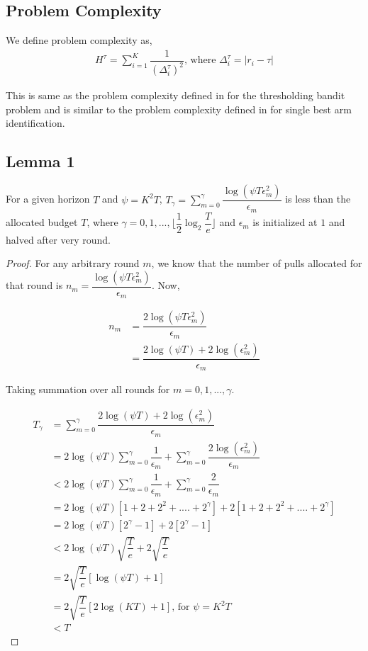 

\subsection{Problem Complexity}

We define problem complexity as,
\begin{align*}
H^{\tau} = \sum_{i=1}^{K}\dfrac{1}{(\Delta_{i}^{\tau})^{2}} \text{, where } \Delta_{i}^{\tau}=|r_{i}-\tau|
\end{align*}

This is same as the problem complexity defined in \cite{locatelli2016optimal} for the thresholding bandit problem and is similar to the problem complexity defined in \cite{audibert2010best} for single best arm identification.

\subsection{Lemma 1} For a given horizon $T$ and $\psi=K^{2}T$, $T_{\gamma} = \sum_{m=0}^{\gamma}\dfrac{\log(\psi T \epsilon_{m}^{2})}{\epsilon_{m}}$ is less than the allocated budget $T$, where $\gamma=0,1,...,\big\lfloor \dfrac{1}{2}\log_{2} \dfrac{T}{e}\big\rfloor$ and $\epsilon_{m}$ is initialized at $1$ and halved after very round. 

\begin{proof}
For any arbitrary round $m$, we know that the number of pulls allocated for that round is 
$n_{m} = \dfrac{\log(\psi T \epsilon_{m}^{2})}{\epsilon_{m}}$. Now, 

\begin{align*}
n_{m} &= \dfrac{2\log(\psi T \epsilon_{m}^{2})}{\epsilon_{m}}\\
&= \dfrac{2\log(\psi T) + 2\log(\epsilon_{m}^{2})}{\epsilon_{m}}
\end{align*}

Taking summation over all rounds for $m=0,1,...,\gamma$. 

\begin{align*}
T_{\gamma} &= \sum_{m=0}^{\gamma}\dfrac{2\log(\psi T) + 2\log(\epsilon_{m}^{2})}{\epsilon_{m}}\\
&= 2\log (\psi T)\sum_{m=0}^{\gamma}\dfrac{1}{\epsilon_{m}} + \sum_{m=0}^{\gamma}\dfrac{2\log (\epsilon_{m}^{2})}{\epsilon_{m}}\\
&< 2\log (\psi T)\sum_{m=0}^{\gamma}\dfrac{1}{\epsilon_{m}} + \sum_{m=0}^{\gamma}\dfrac{2}{\epsilon_{m}}\\
&= 2\log (\psi T)[1+2+2^{2}+....+2^{\gamma}] + 2[1+2+2^{2}+....+2^{\gamma}]\\
&= 2\log (\psi T)[2^{\gamma} - 1] + 2[2^{\gamma} - 1]\\
&< 2\log (\psi T)\sqrt{\dfrac{T}{e}} + 2\sqrt{\dfrac{T}{e}}\\
&= 2\sqrt{\dfrac{T}{e}}[\log (\psi T) + 1]\\
&= 2\sqrt{\dfrac{T}{e}}[2\log (K T) + 1] \text{, for } \psi=K^{2}T\\
&< T
\end{align*}


\end{proof}


